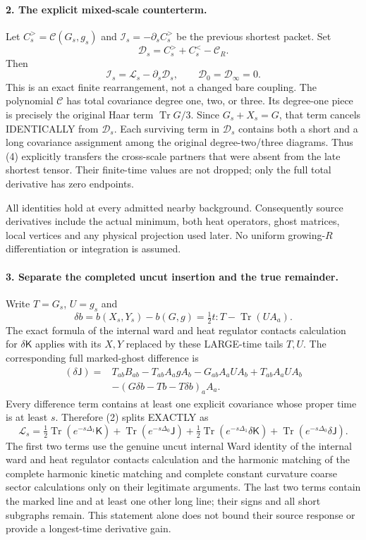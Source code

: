 \documentclass[11pt]{article}
\begin{document}
\paragraph{2. The explicit mixed-scale counterterm.}
Let $C_s^{>}=\mathcal C(G_s,g_s)$ and
$\mathcal I_s=-\partial_s C_s^{>}$ be the previous shortest packet.
Set
\[
 \mathcal D_s=C_s^{>}+C_s^{<}-\mathcal C_R.
\]
Then
\[
 \boxed{\mathcal I_s=\mathcal L_s-\partial_s\mathcal D_s,\qquad
                    \mathcal D_0=\mathcal D_\infty=0.}          \tag{4}
\]
This is an exact finite rearrangement, not a changed bare coupling.
The polynomial $\mathcal C$ has total covariance degree one, two,
or three. Its degree-one piece is precisely the original Haar term
$\operatorname{Tr}G/3$. Since $G_s+X_s=G$, that term cancels IDENTICALLY
from $\mathcal D_s$. Each surviving term in $\mathcal D_s$ contains
both a short and a long covariance assignment among the original
degree-two/three diagrams. Thus (4) explicitly transfers the
cross-scale partners that were absent from the late shortest tensor.
Their finite-time values are not dropped; only the full total
derivative has zero endpoints.

All identities hold at every admitted nearby background. Consequently
source derivatives include the actual minimum, both heat operators,
ghost matrices, local vertices and any physical projection used later.
No uniform growing-$R$ differentiation or integration is assumed.

\paragraph{3. Separate the completed uncut insertion and the true remainder.}
Write $T=G_s$, $U=g_s$ and
\[
 \delta b=b(X_s,Y_s)-b(G,g)
                 =\tfrac12t:T-\operatorname{Tr}(U A_a).
\]
The exact formula of the internal ward and heat regulator contacts calculation for $\delta\mathsf K$ applies with its $X,Y$
replaced by these LARGE-time tails $T,U$.
The corresponding full marked-ghost difference is
\[
 \begin{split}
 (\delta\mathsf J)={}&T_{ab}B_{ab}
 -T_{ab}A_agA_b-G_{ab}A_aUA_b+T_{ab}A_aUA_b\\
 &-(G\delta b-Tb-T\delta b)_a A_a .
 \end{split}                                                    \tag{5}
\]
Every difference term contains at least one explicit covariance whose
proper time is at least $s$. Therefore (2) splits EXACTLY as
\[
 \mathcal L_s=
 \tfrac12\operatorname{Tr}(e^{-s\Delta_1}\mathsf K)
 +\operatorname{Tr}(e^{-s\Delta_0}\mathsf J)
 +\tfrac12\operatorname{Tr}(e^{-s\Delta_1}\delta\mathsf K)
 +\operatorname{Tr}(e^{-s\Delta_0}\delta\mathsf J).                \tag{6}
\]
The first two terms use the genuine uncut internal Ward identity of the internal ward and heat regulator contacts calculation and the
harmonic matching of the complete harmonic kinetic matching and complete constant curvature coarse sector calculations only on their legitimate arguments. The last
two terms contain the marked line and at least one other long line;
their signs and all short subgraphs remain. This statement alone
does not bound their source response or provide a longest-time
derivative gain.
\end{document}
